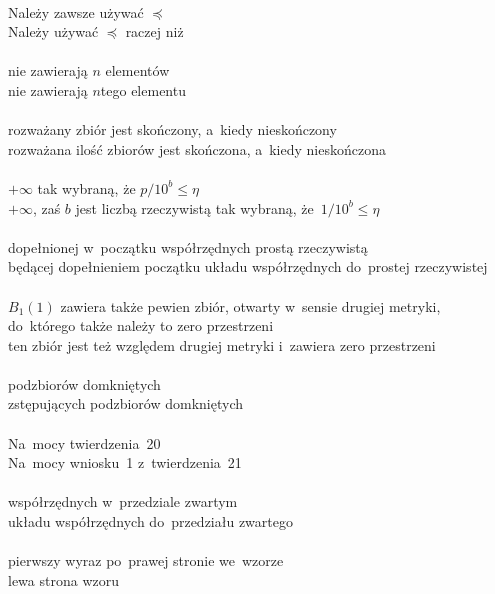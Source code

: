 \documentclass[a4paper,11pt]{article}
\begin{document}
\noi
{} \\
\Jest Należy zawsze używać $\preceq$ \\
\Pow  Należy używać $\preceq$ raczej niż \\
 \\
\Jest nie zawierają $n$ elementów \\
\Pow  nie zawierają $n$\dywiz tego elementu \\
 \\
\Jest rozważany zbiór jest skończony, a~kiedy nieskończony \\
\Pow  rozważana ilość zbiorów jest skończona, a~kiedy nieskończona \\
 \\
\Jest $+\infty$ tak wybraną, że $p / 10^{ b } \leq \eta$ \\
$+\infty$, zaś $b$ jest liczbą rzeczywistą tak wybraną,
że~$1 / 10^{ b } \leq \eta$ \\
 \\
\Jest dopełnionej w~początku współrzędnych prostą rzeczywistą \\
\Pow  będącej dopełnieniem początku układu współrzędnych do~prostej rzeczywistej \\
 \\
\Jest $B_{ 1 }( 1 )$ zawiera także pewien zbiór, otwarty w~sensie drugiej metryki, do~którego także należy to zero przestrzeni \\
\Pow ten zbiór jest też względem drugiej metryki i~zawiera zero
przestrzeni \\ %
 \\
\Jest podzbiorów domkniętych \\
\Pow  zstępujących podzbiorów domkniętych \\
 \\
\Jest Na~mocy twierdzenia~20 \\
\Pow  Na~mocy wniosku~1 z~twierdzenia~21 \\
 \\
\Jest współrzędnych w~przedziale zwartym \\
\Pow  układu współrzędnych do~przedziału zwartego \\
 \\
\Jest pierwszy wyraz po~prawej stronie we~wzorze \\
\Pow  lewa strona wzoru \\
 \\
\end{document}
